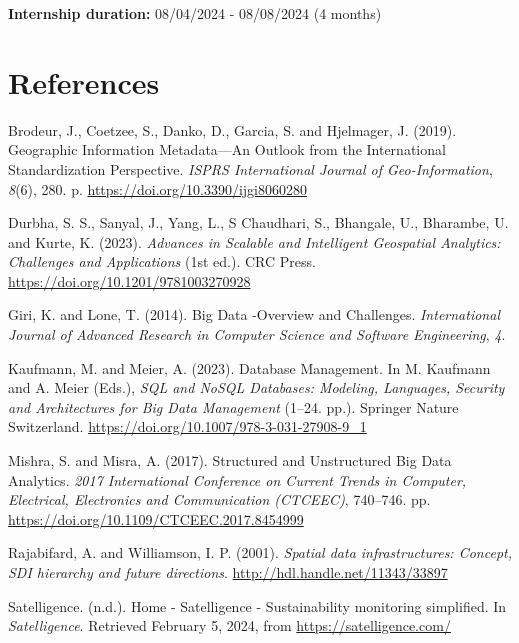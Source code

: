 \documentclass[
  oneside,
  open=any]{scrbook}
\newlength{\cslhangindent}
\newenvironment{CSLReferences}[2] %
 {\begin{list}{}{%
  \setlength{\itemindent}{0pt}
  \setlength{\leftmargin}{0pt}
  \setlength{\parsep}{0pt}
  \ifodd #1
   \setlength{\leftmargin}{\cslhangindent}
   \setlength{\itemindent}{-1\cslhangindent}
  \fi
  \setlength{\itemsep}{#2\baselineskip}}}
 {\end{list}}
\begin{document}
\textbf{Internship duration:} 08/04/2024 - 08/08/2024 (4 months)

\chapter{References}\label{references}

\label{refs}
\begin{CSLReferences}{1}{0}
Brodeur, J., Coetzee, S., Danko, D., Garcia, S. and Hjelmager, J.
(2019). Geographic {Information} {Metadata}---{An} {Outlook} from the
{International} {Standardization} {Perspective}. \emph{ISPRS
International Journal of Geo-Information}, \emph{8}(6), 280. p.
\url{https://doi.org/10.3390/ijgi8060280}

Durbha, S. S., Sanyal, J., Yang, L., S Chaudhari, S., Bhangale, U.,
Bharambe, U. and Kurte, K. (2023). \emph{Advances in {Scalable} and
{Intelligent} {Geospatial} {Analytics}: {Challenges} and {Applications}}
(1st ed.). CRC Press. \url{https://doi.org/10.1201/9781003270928}

Giri, K. and Lone, T. (2014). Big {Data} -{Overview} and {Challenges}.
\emph{International Journal of Advanced Research in Computer Science and
Software Engineering}, \emph{4}.

Kaufmann, M. and Meier, A. (2023). Database {Management}. In M. Kaufmann
and A. Meier (Eds.), \emph{{SQL} and {NoSQL} {Databases}: {Modeling},
{Languages}, {Security} and {Architectures} for {Big} {Data}
{Management}} (1--24. pp.). Springer Nature Switzerland.
\url{https://doi.org/10.1007/978-3-031-27908-9_1}

Mishra, S. and Misra, A. (2017). Structured and {Unstructured} {Big}
{Data} {Analytics}. \emph{2017 {International} {Conference} on {Current}
{Trends} in {Computer}, {Electrical}, {Electronics} and {Communication}
({CTCEEC})}, 740--746. pp.
\url{https://doi.org/10.1109/CTCEEC.2017.8454999}

Rajabifard, A. and Williamson, I. P. (2001). \emph{Spatial data
infrastructures: Concept, {SDI} hierarchy and future directions}.
\url{http://hdl.handle.net/11343/33897}

Satelligence. (n.d.). Home - {Satelligence} - {Sustainability}
monitoring simplified. In \emph{Satelligence}. Retrieved February 5,
2024, from \url{https://satelligence.com/}


\end{CSLReferences}
\end{document}
